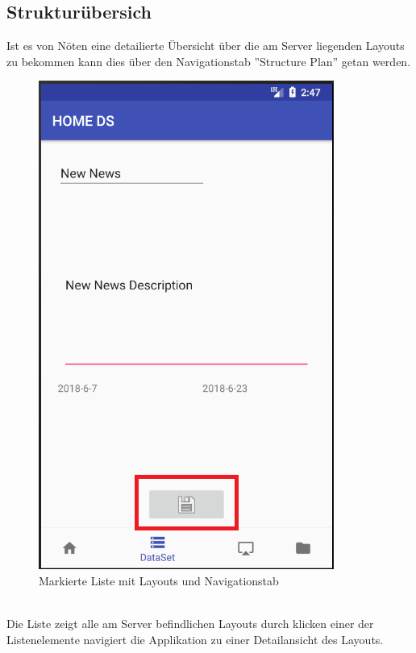 \subsection{Strukturübersich}
Ist es von Nöten eine detailierte Übersicht über die am Server liegenden Layouts zu bekommen kann dies über den Navigationstab ''Structure Plan'' getan werden. 
\\
\begin{figure}[H]
\centering
\includegraphics[scale=0.35]{images/06_AndroidApp/06_EditNewsSaveButton}
\caption{Markierte Liste mit Layouts und Navigationstab}
\label{fig:mediaNav}
\end{figure}
\\
Die Liste zeigt alle am Server befindlichen Layouts durch klicken einer der Listenelemente navigiert die Applikation zu einer Detailansicht des Layouts.
\\
